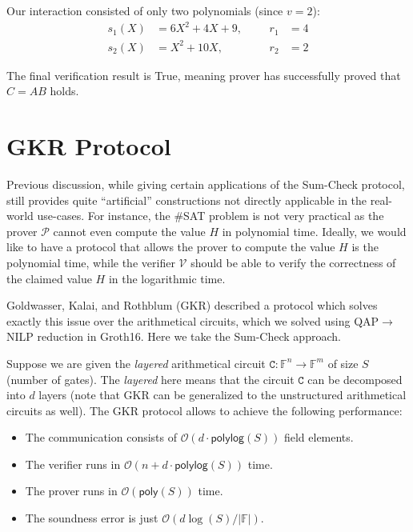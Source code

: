 \documentclass{gkr-template}
\begin{document}
Our interaction consisted of only two polynomials (since $v=2$):
\begin{align*}
    s_1(X) &= 6X^2 + 4X + 9, &&& r_1 &= 4 \\
    s_2(X) &= X^2 + 10X, &&& r_2 &= 2
\end{align*}

The final verification result is \textsf{True}, meaning prover has successfully
proved that $C = AB$ holds. 

\section*{GKR Protocol}

Previous discussion, while giving certain applications of the Sum-Check
protocol, still provides quite ``artificial'' constructions not 
directly applicable in the real-world use-cases. For instance, 
the \#SAT problem is not very practical as the prover $\mathcal{P}$
cannot even compute the value $H$ in polynomial time. Ideally,
we would like to have a protocol that allows the prover to compute
the value $H$ is the polynomial time, while the verifier $\mathcal{V}$
should be able to verify the correctness of the claimed value
$H$ in the logarithmic time. 

Goldwasser, Kalai, and Rothblum (GKR) described a protocol which 
solves exactly this issue over the arithmetical circuits, which
we solved using QAP$\to$NILP reduction in Groth16. Here we take 
the Sum-Check approach.

Suppose we are given the \textit{layered} arithmetical
circuit $\mathtt{C}: \mathbb{F}^n \to \mathbb{F}^m$ of size 
$S$ (number of gates). The \textit{layered} here means 
that the circuit $\mathtt{C}$ can be decomposed into $d$ 
layers (note that GKR can be generalized to the unstructured 
arithmetical circuits as well). The GKR protocol allows 
to achieve the following performance:
\begin{itemize}
    \item The communication consists of $\mathcal{O}(d \cdot \mathsf{polylog}(S))$ field elements.
    \item The verifier runs in $\mathcal{O}(n + d \cdot \mathsf{polylog}(S))$ time.
    \item The prover runs in $\mathcal{O}(\mathsf{poly}(S))$ time.
    \item The soundness error is just $\mathcal{O}(d \log(S) / |\mathbb{F}|)$.
\end{itemize}
\end{document}
